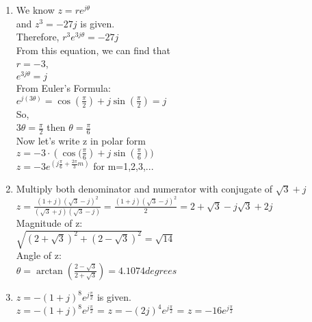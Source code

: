 \documentclass[10pt,a4paper, margin=1in]{article}
\begin{document}
\begin{enumerate}
\begin{enumerate}
    \item
    We know $z = re^{j \theta }$\\
    and $z^3 = -27j$ is given.\\
    Therefore, $r^3e^{3j \theta} = -27j$\\
    From this equation, we can find that\\
    $r = -3$, \\
    $e^{3j \theta } = j$ \\
    From Euler's Formula:\\
    $e^{j(3 \theta) } = \cos{( \frac{ \pi }{2})} + j \sin{(\frac{ \pi }{2})} = j$ \\
    So,\\
    $3 \theta = \frac{ \pi }{2}$ then $ \theta = \frac{ \pi }{6}$ \\
    Now let's write z in polar form\\
    $z = -3\cdot( \cos{( \frac{ \pi }{6}}) + j \sin{( \frac{ \pi }{6})})$ \\
    $z = -3e^{(j\frac{ \pi }{6} + \frac{2 \pi }{3} m)}$ for m=1,2,3,... \\
    \newpage
    \item Multiply both denominator and numerator with conjugate of $\sqrt{3}+j$\\
    $z = \frac{(1 + j)(\sqrt{3} - j)^2}{(\sqrt{3} + j)(\sqrt{3} - j)} = \frac{(1 + j)(\sqrt{3} - j)^2}{2} = 2 + \sqrt{3} - j\sqrt{3} + 2j $ \\
    Magnitude of z:\\
    $\sqrt{(2+\sqrt{3})^2+(2-\sqrt{3})^2} = \sqrt{14}$\\
    Angle of z:\\
    $ \theta = \arctan{( \frac{2-\sqrt{3}}{2+\sqrt{3}} )} = 4.1074 degrees$ \\
    \item $z = -(1+j)^8e^{j\frac{\pi}{2}}$ is given.\\
    $z = -(1+j)^8e^{j\frac{\pi}{2}}$ = $z = -(2j)^4e^{j\frac{\pi}{2}}$ = $z = -16e^{j\frac{\pi}{2}}$\\
    \end{enumerate}


\end{enumerate}
\end{document}
